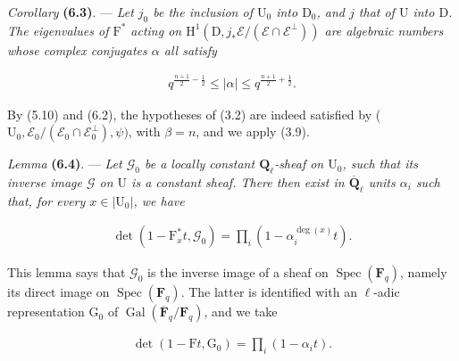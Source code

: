 \documentclass[10pt,leqno]{article}
\begin{document}
\noindent \emph{Corollary} \textbf{(6.3)}. — {\itshape Let \(j_{0}\) be the inclusion of \(\mathrm{U}_{0}\) into \(\mathrm{D}_{0}\), and \(j\) that of \(\mathrm{U}\) into \(\mathrm{D}\). The eigenvalues of \(\mathrm{F}^{*}\) acting on \(\mathrm{H}^{1}(\mathrm{D},j_{*}\mathcal{E} /(\mathcal{E} \cap \mathcal{E} ^{\perp }))\) are algebraic numbers whose complex conjugates \(\alpha \) all satisfy}\par

\begin{equation*}\begin{gathered}q^{\frac{n+1}{2}- \frac{1}{2}} \leq  |\alpha | \leq  q^{\frac{n+1}{2}+\frac{1}{2}}.\end{gathered}\end{equation*}

\noindent By (5.10) and (6.2), the hypotheses of (3.2) are indeed satisfied by (\(\mathrm{U}_{0},\mathcal{E} _{0}/(\mathcal{E} _{0}\cap \mathcal{E} _{0}^{\perp }),\psi )\), with \(\beta =n\), and we apply (3.9).\par

\noindent \emph{Lemma} \textbf{(6.4)}. — {\itshape Let \(\mathcal{G} _{0}\) be a locally constant \(\mathbf{Q}_{\ell }\)-sheaf on \(\mathrm{U}_{0}\), such that its inverse image \(\mathcal{G} \) on \(\mathrm{U}\) is a constant sheaf. There then exist in \(\overline{\mathbf{Q}}_{\ell }\) units \(\alpha _{i}\) such that, for every \(x\in |\mathrm{U}_{0}|\), we have}\par

\begin{equation*}\begin{gathered}\operatorname{det}(1- \mathrm{F}_{x}^{*}t,\mathcal{G} _{0})=\prod _{i}(1- \alpha _{i}^{\operatorname{deg}(x)}t).\end{gathered}\end{equation*}

\clearpage

\label{physical-25}\setcounter{page}{296}

\noindent This lemma says that \(\mathcal{G} _{0}\) is the inverse image of a sheaf on \(\operatorname{Spec}(\mathbf{F}_{q})\), namely its direct image on \(\operatorname{Spec}(\mathbf{F}_{q})\). The latter is identified with an \(\ell \)-adic representation \(\mathrm{G}_{0}\) of \(\operatorname{Gal}(\overline{\mathbf{F}}_{q}/\mathbf{F}_{q})\), and we take\par

\begin{equation*}\begin{gathered}\operatorname{det}(1- \mathrm{F}t,\mathrm{G}_{0})=\prod _{i}(1- \alpha _{i} t).\end{gathered}\end{equation*}
\end{document}

